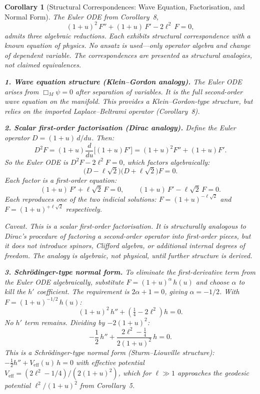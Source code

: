 \documentclass[12pt]{amsart}
\newtheorem{corollary}{Corollary}
\begin{document}
\begin{corollary}[Structural Correspondences: Wave Equation, Factorisation, and Normal Form]
The Euler ODE from Corollary~8,
\[
  (1+u)^2\, F'' + (1+u)\, F' - 2\ell^2\, F = 0,
\]
admits three algebraic reductions. Each exhibits structural correspondence with a known equation
of physics. No ansatz is used---only operator algebra and change of dependent variable. The
correspondences are presented as structural analogies, not claimed equivalences.

\textbf{1. Wave equation structure (Klein--Gordon analogy).} The Euler ODE arises from
$\Box_M \psi = 0$ after separation of variables. It is the full second-order wave equation on
the manifold. This provides a Klein--Gordon-type structure, but relies on the imported
Laplace--Beltrami operator (Corollary~8).

\textbf{2. Scalar first-order factorisation (Dirac analogy).} Define the Euler operator
$D = (1+u)\, d/du$. Then:
\[
  D^2 F = (1+u)\frac{d}{du}\bigl[(1+u)F'\bigr] = (1+u)^2 F'' + (1+u)F'.
\]
So the Euler ODE is $D^2 F - 2\ell^2 F = 0$, which factors algebraically:
\[
  \bigl(D - \ell\sqrt{2}\bigr)\bigl(D + \ell\sqrt{2}\bigr) F = 0.
\]
Each factor is a first-order equation:
\[
  (1+u)\, F' + \ell\sqrt{2}\, F = 0, \qquad
  (1+u)\, F' - \ell\sqrt{2}\, F = 0.
\]
Each reproduces one of the two indicial solutions:
$F = (1+u)^{-\ell\sqrt{2}}$ and $F = (1+u)^{+\ell\sqrt{2}}$ respectively.

\textit{Caveat.} This is a scalar first-order factorisation. It is structurally analogous to
Dirac's procedure of factoring a second-order operator into first-order pieces, but it does not
introduce spinors, Clifford algebra, or additional internal degrees of freedom. The analogy is
algebraic, not physical, until further structure is derived.

\textbf{3. Schr\"odinger-type normal form.} To eliminate the first-derivative term from the
Euler ODE algebraically, substitute $F = (1+u)^\alpha\, h(u)$ and choose $\alpha$ to kill the
$h'$ coefficient. The requirement is $2\alpha + 1 = 0$, giving $\alpha = -1/2$. With
$F = (1+u)^{-1/2}\, h(u)$:
\[
  (1+u)^2\, h'' + \left(\tfrac{1}{4} - 2\ell^2\right) h = 0.
\]
No $h'$ term remains. Dividing by $-2(1+u)^2$:
\[
  -\frac{1}{2}\, h'' + \frac{2\ell^2 - \tfrac{1}{4}}{2(1+u)^2}\, h = 0.
\]
This is a Schr\"odinger-type normal form (Sturm--Liouville structure):
$-\tfrac{1}{2} h'' + V_{\mathrm{eff}}(u)\, h = 0$ with effective potential
$V_{\mathrm{eff}} = (2\ell^2 - 1/4)/(2(1+u)^2)$, which for $\ell \gg 1$ approaches the
geodesic potential $\ell^2/(1+u)^2$ from Corollary~5.


\end{corollary}
\end{document}
